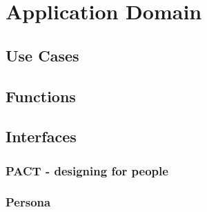 \chapter{Application Domain}

\section{Use Cases}\label{usecase}


\section{Functions}


\section{Interfaces}
\subsection{PACT - designing for people}\label{pact}


\subsection{Persona}
